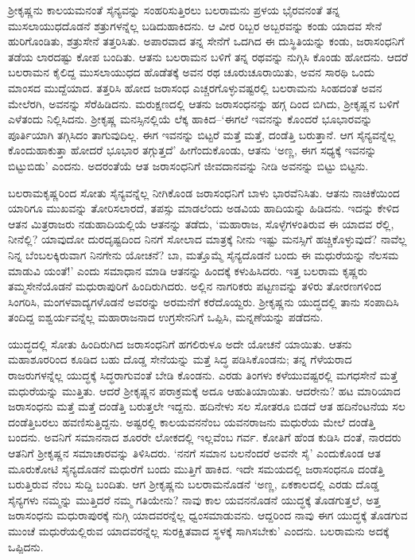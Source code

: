 ಶ್ರೀಕೃಷ್ಣನು ಕಾಲಯಮನಂತೆ ಸೈನ್ಯವನ್ನು ಸಂಹರಿಸುತ್ತಿರಲು ಬಲರಾಮನು ಪ್ರಳಯ ಭೈರವನಂತೆ ತನ್ನ ಮುಸಲಾಯುಧದೊಡನೆ ಶತ್ರುಗಳನ್ನೆಲ್ಲ ಬಡಿದುಹಾಕಿದನು. ಆ ವೀರ ರಿಬ್ಬರ ಅಬ್ಬರವನ್ನು ಕಂಡು ಯಾದವ ಸೇನೆ ಹುರಿಗೊಂಡಿತು, ಶತ್ರುಸೇನೆ ತತ್ತರಿಸಿತು. ಅಪಾರವಾದ ತನ್ನ ಸೇನೆಗೆ ಒದಗಿದ ಈ ದುಸ್ಥಿತಿಯನ್ನು ಕಂಡು, ಜರಾಸಂಧನಿಗೆ ತಡೆಯ ಲಾರದಷ್ಟು ಕೋಪ ಬಂದಿತು. ಆತನು ಬಲರಾಮನ ಬಳಿಗೆ ತನ್ನ ರಥವನ್ನು ನುಗ್ಗಿಸಿ ಕೊಂಡು ಹೋದನು. ಆದರೆ ಬಲರಾಮನ ಕೈಲಿದ್ದ ಮುಸಲಾಯುಧದ ಹೊಡೆತಕ್ಕೆ ಅವನ ರಥ ಚೂರುಚೂರಾಯಿತು, ಅವನ ಸಾರಥಿ ಒಂದು ಮಾಂಸದ ಮುದ್ದೆಯಾದ. ತತ್ತರಿಸಿ ಹೋದ ಜರಾಸಂಧ ಎಚ್ಚರಗೊಳ್ಳುವಷ್ಟರಲ್ಲಿ ಬಲರಾಮನು ಸಿಂಹದಂತೆ ಅವನ ಮೇಲೆರಗಿ, ಅವನನ್ನು ಸೆರೆಹಿಡಿದನು. ಮರುಕ್ಷಣದಲ್ಲಿ ಆತನು ಜರಾಸಂಧನನ್ನು ಹಗ್ಗ ದಿಂದ ಬಿಗಿದು, ಶ್ರೀಕೃಷ್ಣನ ಬಳಿಗೆ ಎಳೆತಂದು ನಿಲ್ಲಿಸಿದನು. ಶ್ರೀಕೃಷ್ಣ ಮನಸ್ಸಿನಲ್ಲಿಯೆ ಲೆಕ್ಕ ಹಾಕಿದ–‘ಈಗಲೆ ಇವನನ್ನು ಕೊಂದರೆ ಭೂಭಾರವನ್ನು ಪೂರ್ತಿಯಾಗಿ ತಗ್ಗಿಸಿದಂ ತಾಗುವುದಿಲ್ಲ. ಈಗ ಇವನನ್ನು ಬಿಟ್ಟರೆ ಮತ್ತೆ ಮತ್ತೆ, ದಂಡೆತ್ತಿ ಬರುತ್ತಾನೆ. ಆಗ ಸೈನ್ಯವನ್ನೆಲ್ಲ ಕೊಂದುಹಾಕುತ್ತಾ ಹೋದರೆ ಭೂಭಾರ ತಗ್ಗುತ್ತದೆ’ ಹೀಗೆಂದುಕೊಂಡು, ಆತನು ‘ಅಣ್ಣ, ಈಗ ಸಧ್ಯಕ್ಕೆ ಇವನನ್ನು ಬಿಟ್ಟುಬಿಡು’ ಎಂದನು. ಅದರಂತೆಯೆ ಆತ ಜರಾಸಂಧನಿಗೆ ಜೀವದಾನವನ್ನು ನೀಡಿ ಅವನನ್ನು ಬಿಟ್ಟು ಬಿಟ್ಟನು.

ಬಲರಾಮಕೃಷ್ಣರಿಂದ ಸೋತು ಸೈನ್ಯವನ್ನೆಲ್ಲ ನೀಗಿಕೊಂಡ ಜರಾಸಂಧನಿಗೆ ಬಾಳು ಭಾರವೆನಿಸಿತು. ಆತನು ನಾಚಿಕೆಯಿಂದ ಯಾರಿಗೂ ಮುಖವನ್ನು ತೋರಿಸಲಾರದೆ, ತಪಸ್ಸು ಮಾಡಲೆಂದು ಅಡವಿಯ ಹಾದಿಯನ್ನು ಹಿಡಿದನು. ಇದನ್ನು ಕೇಳಿದ ಆತನ ಮಿತ್ರರಾಜರು ನಡುಹಾದಿಯಲ್ಲಿಯೆ ಆತನನ್ನು ತಡೆದು, ‘ಮಹಾರಾಜ, ಸೊಳ್ಳೆಗಳಂತಿರುವ ಈ ಯಾದವ ರೆಲ್ಲಿ, ನೀನೆಲ್ಲಿ? ಯಾವುದೋ ದುರದೃಷ್ಟದಿಂದ ನಿನಗೆ ಸೋಲಾದ ಮಾತ್ರಕ್ಕೆ ನೀನು ಇಷ್ಟು ಮನಸ್ಸಿಗೆ ಹಚ್ಚಿಕೊಳ್ಳುವುದೆ? ನಾವೆಲ್ಲ ನಿನ್ನ ಬೆಂಬಲಕ್ಕಿರುವಾಗ ನಿನಗೇನು ಯೋಚನೆ? ಬಾ, ಮತ್ತೊಮ್ಮೆ ಸೈನ್ಯದೊಡನೆ ಬಂದು ಈ ಮಧುರೆಯನ್ನು ನೆಲಸಮ ಮಾಡುವಿ ಯಂತೆ!’ ಎಂದು ಸಮಾಧಾನ ಮಾಡಿ ಆತನನ್ನು ಹಿಂದಕ್ಕೆ ಕಳುಹಿಸಿದರು. ಇತ್ತ ಬಲರಾಮ ಕೃಷ್ಣರು ತಮ್ಮಸೇನೆಯೊಡನೆ ಮಧುರಾಪುರಿಗೆ ಹಿಂದಿರುಗಿದರು. ಅಲ್ಲಿನ ನಾಗರಿಕರು ಪಟ್ಟಣವನ್ನು ತಳಿರು ತೋರಣಗಳಿಂದ ಸಿಂಗರಿಸಿ, ಮಂಗಳವಾದ್ಯಗಳೊಡನೆ ಅವರನ್ನು ಅರಮನೆಗೆ ಕರೆದೊಯ್ದರು. ಶ್ರೀಕೃಷ್ಣನು ಯುದ್ಧದಲ್ಲಿ ತಾನು ಸಂಪಾದಿಸಿ ತಂದಿದ್ದ ಐಶ್ವರ್ಯವನ್ನೆಲ್ಲ ಮಹಾರಾಜನಾದ ಉಗ್ರಸೇನನಿಗೆ ಒಪ್ಪಿಸಿ, ಮನ್ನಣೆಯನ್ನು ಪಡೆದನು.

ಯುದ್ಧದಲ್ಲಿ ಸೋತು ಹಿಂದಿರುಗಿದ ಜರಾಸಂಧನಿಗೆ ಹಗಲಿರುಳೂ ಅದೇ ಯೋಚನೆ ಯಾಯಿತು. ಆತನು ಮಹಾಶೂರರಿಂದ ಕೂಡಿದ ಬಹು ದೊಡ್ಡ ಸೇನೆಯನ್ನು ಮತ್ತೆ ಸಿದ್ಧ ಪಡಿಸಿಕೊಂಡನು; ತನ್ನ ಗೆಳೆಯರಾದ ರಾಜರುಗಳನ್ನೆಲ್ಲ ಯುದ್ಧಕ್ಕೆ ಸಿದ್ಧರಾಗುವಂತೆ ಬೇಡಿ ಕೊಂಡನು. ಎರಡು ತಿಂಗಳು ಕಳೆಯುವಷ್ಟರಲ್ಲಿ ಮಗಧಸೇನೆ ಮತ್ತೆ ಮಧುರೆಯನ್ನು ಮುತ್ತಿತು. ಆದರೆ ಶ್ರೀಕೃಷ್ಣನ ಪರಾಕ್ರಮಕ್ಕೆ ಅದೂ ಆಹುತಿಯಾಯಿತು. ಆದರೇನು? ಹಟ ಮಾರಿಯಾದ ಜರಾಸಂಧನು ಮತ್ತೆ ಮತ್ತೆ ದಂಡೆತ್ತಿ ಬರುತ್ತಲೇ ಇದ್ದನು. ಹದಿನೇಳು ಸಲ ಸೋತರೂ ಬಿಡದೆ ಆತ ಹದಿನೆಂಟನೆಯ ಸಲ ದಂಡೆತ್ತಿಬರಲು ಹವಣಿಸುತ್ತಿದ್ದನು. ಅಷ್ಟರಲ್ಲಿ ಕಾಲಯವನನೆಂಬ ಯವನರಾಜನು ಮಧುರೆಯ ಮೇಲೆ ದಂಡೆತ್ತಿ ಬಂದನು. ಅವನಿಗೆ ಸಮಾನನಾದ ಶೂರರೇ ಲೋಕದಲ್ಲಿ ಇಲ್ಲವೆಂಬ ಗರ್ವ. ಕೋತಿಗೆ ಹೆಂಡ ಕುಡಿಸಿ ದಂತೆ, ನಾರದರು ಆತನಿಗೆ ಶ್ರೀಕೃಷ್ಣನ ಸಮಾಚಾರವನ್ನು ತಿಳಿಸಿದರು. ‘ನನಗೆ ಸಮಾನ ಬಲನೆಂದರೆ ಅವನೇ ಸೈ’ ಎಂದುಕೊಂಡ ಆತ ಮೂರುಕೋಟಿ ಸೈನ್ಯದೊಡನೆ ಮಧುರೆಗೆ ಬಂದು ಮುತ್ತಿಗೆ ಹಾಕಿದ. ಇದೇ ಸಮಯದಲ್ಲಿ ಜರಾಸಂಧನೂ ದಂಡೆತ್ತಿ ಬರುತ್ತಿರುವ ನೆಂಬ ಸುದ್ದಿ ಬಂದಿತು. ಆಗ ಶ್ರೀಕೃಷ್ಣನು ಬಲರಾಮನೊಡನೆ ‘ಅಣ್ಣ, ಏಕಕಾಲದಲ್ಲಿ ಎರಡು ದೊಡ್ಡ ಸೈನ್ಯಗಳು ನಮ್ಮನ್ನು ಮುತ್ತಿದರೆ ನಮ್ಮ ಗತಿಯೇನು? ನಾವು ಕಾಲ ಯವನನೊಡನೆ ಯುದ್ಧಕ್ಕೆ ತೊಡಗುತ್ತಲೆ, ಅತ್ತ ಜರಾಸಂಧನು ಮಧುರಾಪುರಕ್ಕೆ ನುಗ್ಗಿ ಯಾದವರನ್ನೆಲ್ಲ ಧ್ವಂಸಮಾಡುವನು. ಆದ್ದರಿಂದ ನಾವು ಈಗ ಯುದ್ಧಕ್ಕೆ ತೊಡಗುವ ಮುಂಚೆ ಮಧುರೆಯಲ್ಲಿರುವ ಯಾದವರನ್ನೆಲ್ಲ ಸುರಕ್ಷಿತವಾದ ಸ್ಥಳಕ್ಕೆ ಸಾಗಿಸಬೇಕು’ ಎಂದನು. ಬಲರಾಮನು ಅದಕ್ಕೆ ಒಪ್ಪಿದನು.

